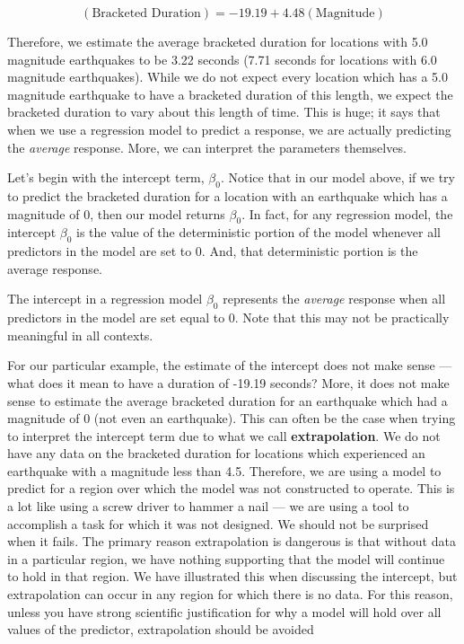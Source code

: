 \documentclass[]{book}
\theoremstyle{plain}
\theoremstyle{mydefn}
\theoremstyle{myexmpl}
\theoremstyle{remark}
\let\BeginKnitrBlock\begin \let\EndKnitrBlock\end
\let\BeginKnitrBlock\begin \let\EndKnitrBlock\end
\begin{document}
\[(\text{Bracketed Duration}) = -19.19 + 4.48 (\text{Magnitude})\]

Therefore, we estimate the average bracketed duration for locations with
5.0 magnitude earthquakes to be 3.22 seconds (7.71 seconds for locations
with 6.0 magnitude earthquakes). While we do not expect every location
which has a 5.0 magnitude earthquake to have a bracketed duration of
this length, we expect the bracketed duration to vary about this length
of time. This is huge; it says that when we use a regression model to
predict a response, we are actually predicting the \emph{average}
response. More, we can interpret the parameters themselves.

Let's begin with the intercept term, \(\beta_0\). Notice that in our
model above, if we try to predict the bracketed duration for a location
with an earthquake which has a magnitude of 0, then our model returns
\(\beta_0\). In fact, for any regression model, the intercept
\(\beta_0\) is the value of the deterministic portion of the model
whenever all predictors in the model are set to 0. And, that
deterministic portion is the average response.

\BeginKnitrBlock{rmdtip}
The intercept in a regression model \(\beta_0\) represents the
\emph{average} response when all predictors in the model are set equal
to 0. Note that this may not be practically meaningful in all contexts.
\EndKnitrBlock{rmdtip}

For our particular example, the estimate of the intercept does not make
sense --- what does it mean to have a duration of -19.19 seconds? More,
it does not make sense to estimate the average bracketed duration for an
earthquake which had a magnitude of 0 (not even an earthquake). This can
often be the case when trying to interpret the intercept term due to
what we call \textbf{extrapolation}. We do not have any data on the
bracketed duration for locations which experienced an earthquake with a
magnitude less than 4.5. Therefore, we are using a model to predict for
a region over which the model was not constructed to operate. This is a
lot like using a screw driver to hammer a nail --- we are using a tool
to accomplish a task for which it was not designed. We should not be
surprised when it fails. The primary reason extrapolation is dangerous
is that without data in a particular region, we have nothing supporting
that the model will continue to hold in that region. We have illustrated
this when discussing the intercept, but extrapolation can occur in any
region for which there is no data. For this reason, unless you have
strong scientific justification for why a model will hold over all
values of the predictor, extrapolation should be avoided
\end{document}
